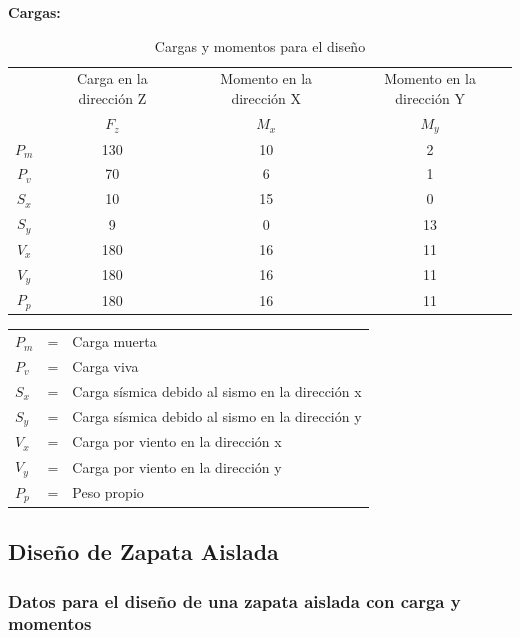 \documentclass{article}%
\begin{document}
\textbf{Cargas:}


\begin{table}[h!]
    \centering
    \begin{tabular}{cccc} \toprule
         & Carga en la dirección Z & Momento en la dirección X & Momento en la dirección Y  \\ 
         & $F_z$ & $M_x $ & $M_y$ \\ \midrule
        $P_m$ & 130& 10 & 2 \\
        $P_v$ & 70 & 6 & 1 \\
        $S_x$ & 10 & 15 & 0 \\
        $S_y$ & 9 & 0 & 13 \\
        $V_x$ & 180 & 16 & 11 \\
        $V_y$ & 180 & 16 & 11 \\
        $P_p$ & 180 & 16 & 11 \\\bottomrule
    \end{tabular}
    \caption{Cargas y momentos para el diseño}
    \label{tab:my_label}
\end{table}

\begin{table}[h!]
    \centering
    \begin{tabular}{lll}
        $P_m$ &=&   Carga muerta\\
        $P_v$ &=&   Carga viva\\
        $S_x$ &=&   Carga sísmica debido al sismo en la dirección x\\
        $S_y$ &=&   Carga sísmica debido al sismo en la dirección y\\
        $V_x$ &=&   Carga por viento en la dirección x\\
        $V_y$ &=&   Carga por viento en la dirección y\\
        $P_p$ &=&   Peso propio\\
    \end{tabular}
\end{table}

%
\subsection{Diseño de Zapata Aislada}%
\label{subsec:DiseodeZapataAislada}%
\FPset{}
\FPset{}
%
\subsubsection{Datos para el diseño de una zapata aislada con carga y momentos}
\end{document}

